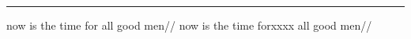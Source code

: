 

\hsize=1.5in

\hrule

\begingl[glrightskip=0pt plus 1fil]
\gla now is the time for all good men//
\glb now is the time forxxxx all good men//
\endgl


\endinput

\psscalebox{3}{\ips e@e}

\bigskip

\psscalebox{3}{{\it e}{\ips @}{\it e}}

